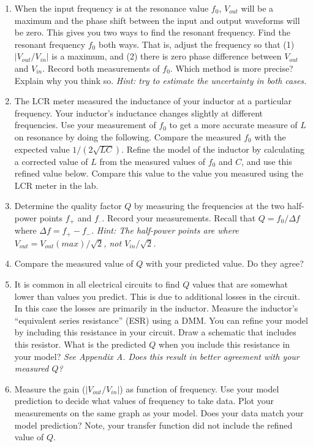 \documentclass[10pt]{PhysLab1C} %
\begin{document}
\begin{enumerate}
\def\labelenumi{\arabic{enumi}.}
\item
  When the input frequency is at the resonance value $f_0$, $V_{out}$ will be a
  maximum and the phase shift between the input and output waveforms
  will be zero. This gives you two ways to find the resonant frequency.
  Find the resonant frequency $f_0$ both ways. That is, adjust the
  frequency so that (1) \(|V_{out}/V_{in}|\) is a maximum, and (2) there
  is zero phase difference between \(V_{out}\) and \(V_{in}\). Record
  both measurements of \(f_0\). Which method is more precise? Explain
  why you think so. \emph{Hint: try to estimate the uncertainty in both
  cases.}
\item
  The LCR meter measured the inductance of your inductor at a particular
  frequency. Your inductor's inductance changes slightly at different
  frequencies. Use your measurement of \(f_0\) to get a more accurate
  measure of \(L\) on resonance by doing the following. Compare the
  measured \(f_0\) with the expected value \(1/(2\sqrt{LC})\). Refine
  the model of the inductor by calculating a corrected value of \(L\)
  from the measured values of \(f_0\) and \(C\), and use this refined
  value below. Compare this value to the value you measured using the
  LCR meter in the lab.
\item
  Determine the quality factor \(Q\) by measuring the frequencies at the
  two half-power points \(f_+\) and \(f_–\). Record your measurements.
  Recall that \(Q=f_0/\Delta f\) where \(\Delta f=f_+-f_-\). \emph{Hint:
  The half-power points are where \(V_{out}=V_{out}(max)/\sqrt 2\), not
  \(V_{in}/\sqrt 2\).}
\item
  Compare the measured value of \(Q\) with your predicted value. Do they
  agree?
\item
  It is common in all electrical circuits to find \(Q\) values that are
  somewhat lower than values you predict. This is due to additional
  losses in the circuit. In this case the losses are primarily in the
  inductor. Measure the inductor's ``equivalent series resistance''
  (ESR) using a DMM. You can refine your model by including this
  resistance in your circuit. Draw a schematic that includes this
  resistor. What is the predicted \(Q\) when you include this resistance
  in your model? \emph{See Appendix A. Does this result in
  better agreement with your measured \(Q\)?}
\item
  Measure the gain (\(|V_{out}/V_{in}|\)) as function of frequency. Use
  your model prediction to decide what values of frequency to take data.
  Plot your measurements on the same graph as your model. Does your data
  match your model prediction? Note, your transfer function did not
  include the refined value of \(Q\).
\end{enumerate}
\end{document}
